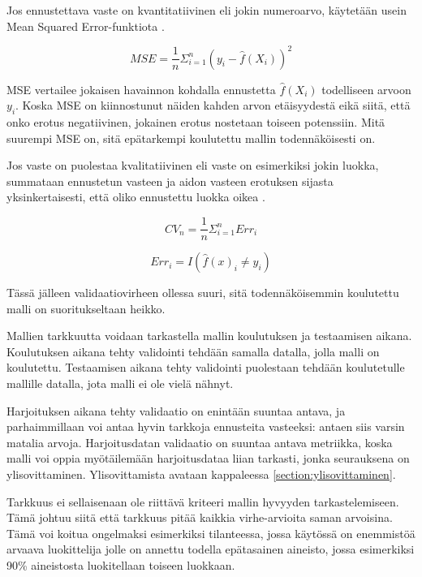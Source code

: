 \documentclass[finnish,twoside,openright]{HYgraduMLDS}
\begin{document}
Jos ennustettava vaste on kvantitatiivinen eli jokin numeroarvo, käytetään usein Mean Squared Error-funktiota \cite{james2013ISLR}.

\begin{equation}
    MSE = \frac{1}{n} \Sigma^n_{i=1} (y_i - \hat{f}(X_i))^2
\end{equation}

MSE vertailee jokaisen havainnon kohdalla ennustetta $\hat{f}(X_i)$ todelliseen arvoon $y_i$. Koska MSE on kiinnostunut näiden kahden  arvon etäisyydestä eikä siitä, että onko erotus negatiivinen, jokainen erotus nostetaan toiseen potenssiin. Mitä suurempi MSE on, sitä epätarkempi koulutettu mallin todennäköisesti on.

Jos vaste on puolestaa kvalitatiivinen eli vaste on esimerkiksi jokin luokka, summataan ennustetun vasteen ja aidon vasteen erotuksen sijasta yksinkertaisesti, että oliko ennustettu luokka oikea \cite{james2013ISLR}.

\begin{equation}
    CV_{n} = \frac{1}{n} \Sigma^n_{i=1} Err_i
\end{equation}

\begin{equation} \label{eq:clf_error}
    Err_i = I(\hat{f}(x)_i \neq y_i)
\end{equation}

Tässä jälleen validaatiovirheen ollessa suuri, sitä todennäköisemmin koulutettu malli on suoritukseltaan heikko.

Mallien tarkkuutta voidaan tarkastella mallin koulutuksen ja testaamisen aikana. Koulutuksen aikana tehty validointi tehdään samalla datalla, jolla malli on koulutettu. Testaamisen aikana tehty validointi puolestaan tehdään koulutetulle mallille datalla, jota malli ei ole vielä nähnyt.

Harjoituksen aikana tehty validaatio on enintään suuntaa antava, ja parhaimmillaan voi antaa hyvin tarkkoja ennusteita vasteeksi: antaen siis varsin matalia arvoja. Harjoitusdatan validaatio on suuntaa antava metriikka, koska malli voi oppia myötäilemään harjoitusdataa liian tarkasti, jonka seurauksena on ylisovittaminen. Ylisovittamista avataan kappaleessa \ref{section:ylisovittaminen}.

Tarkkuus ei sellaisenaan ole riittävä kriteeri mallin hyvyyden tarkastelemiseen. Tämä johtuu siitä että tarkkuus pitää kaikkia virhe-arvioita saman arvoisina. Tämä voi koitua ongelmaksi esimerkiksi tilanteessa, jossa käytössä on enemmistöä arvaava luokittelija jolle on annettu todella epätasainen aineisto, jossa esimerkiksi 90\% aineistosta luokitellaan toiseen luokkaan.
\end{document}

